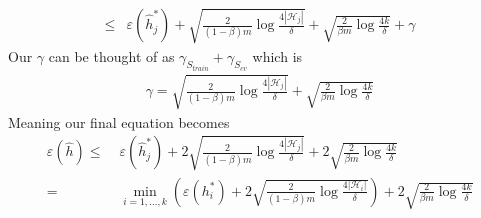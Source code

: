 \documentclass{article}
\begin{document}
\begin{enumerate}[label=(\alph*)]
\begin{align*}
       \leq&{}\varepsilon(\hat{h}_j^*) +  \sqrt{\frac{2}{(1-\beta)m}\log\frac{4|\mathcal{H}_j|}{\delta}}+ \sqrt{\frac{2}{\beta m}\log \frac{4k}{\delta}} + \gamma
    \end{align*}
    Our $\gamma$ can be thought of as $\gamma_{S_{train}} + \gamma_{S_{cv}}$ which is
    \begin{align*}
        \gamma = \sqrt{\frac{2}{(1-\beta)m}\log\frac{4|\mathcal{H}_j|}{\delta}}+ \sqrt{\frac{2}{\beta m}\log \frac{4k}{\delta}}
    \end{align*}
    Meaning our final equation becomes
    \begin{align*}
        \varepsilon(\hat{h})
        \leq&{}\;\varepsilon(\hat{h}_j^*) +  2\sqrt{\frac{2}{(1-\beta)m}\log\frac{4|\mathcal{H}_j|}{\delta}}+ 2\sqrt{\frac{2}{\beta m}\log \frac{4k}{\delta}}\\
        =&{}\;\min_{i=1,...,k}\left(\varepsilon(h_i^*)+2\sqrt{\frac{2}{(1-\beta)m}\log\frac{4|\mathcal{H}_i|}{\delta}}\right)+ 2\sqrt{\frac{2}{\beta m}\log \frac{4k}{\delta}}\\
    \end{align*}
\end{enumerate}
\end{document}
